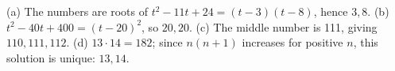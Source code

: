 (a) The numbers are roots of $t^2-11t+24=(t-3)(t-8)$, hence $\boxed{3,8}$. (b) $t^2-40t+400=(t-20)^2$, so $\boxed{20,20}$. (c) The middle number is 111, giving $\boxed{110,111,112}$. (d) $13\cdot14=182$; since $n(n+1)$ increases for positive $n$, this solution is unique: $\boxed{13,14}$.
